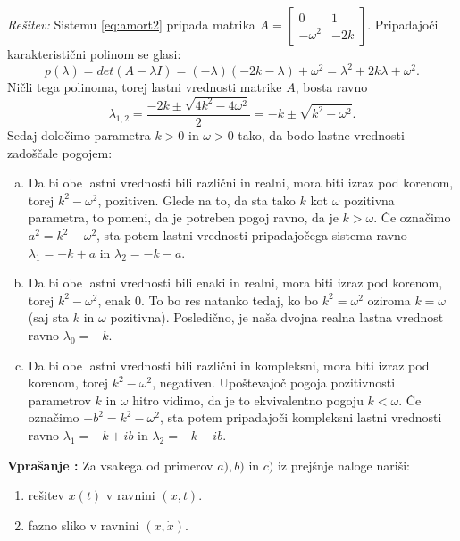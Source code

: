 \documentclass[a4paper, 10pt]{article}
\newcounter{vprcount}
\newenvironment{Vpr}{\begin{flushleft}\stepcounter{vprcount}\textbf{Vprašanje \arabic{vprcount}:}}{\hfill\end{flushleft}}
\newenvironment{Rešitev}{\begin{flushleft}\textit{Rešitev:}}{\hfill\end{flushleft}}
\begin{document}
		\begin{Rešitev}
				Sistemu \ref{eq:amort2} pripada matrika $A = \begin{bmatrix}
				0 & 1 \\
				-\omega^2 & -2k
			\end{bmatrix}$. Pripadajoči karakteristični polinom se glasi: $$p(\lambda) = det(A - \lambda I) = (-\lambda)(-2k-\lambda) + \omega^2 = \lambda^2 + 2k\lambda + \omega^2 .$$ Ničli tega polinoma, torej lastni vrednosti matrike $A$, bosta ravno $$ \lambda_{1, 2} = \frac{-2k \pm \sqrt{4k^2 - 4\omega^2}}{2} = -k \pm \sqrt{k^2 - \omega^2}.$$ Sedaj določimo parametra $k>0$ in $\omega >0$ tako, da bodo lastne vrednosti zadoščale pogojem:
			\begin{enumerate}[a)]
				\item Da bi obe lastni vrednosti bili različni in realni, mora biti izraz pod korenom, torej $k^2 - \omega^2$, pozitiven. Glede na to, da sta tako $k$ kot $\omega$ pozitivna parametra, to pomeni, da je potreben pogoj ravno, da je $k>\omega$. Če označimo $a^2 = k^2 - \omega^2$, sta potem lastni vrednosti pripadajočega sistema ravno $\lambda_1 = -k + a$ in $\lambda_2 = -k-a$.
				\item Da bi obe lastni vrednosti bili enaki in realni, mora biti izraz pod korenom, torej $k^2 - \omega^2$, enak $0$. To bo res natanko tedaj, ko bo $k^2 = \omega^2$ oziroma $k = \omega$ (saj sta $k$ in $\omega$ pozitivna). Posledično, je naša dvojna realna lastna vrednost ravno $\lambda_0 = -k$.
				\item Da bi obe lastni vrednosti bili različni in kompleksni, mora biti izraz pod korenom, torej $k^2 - \omega^2$, negativen. Upoštevajoč pogoja pozitivnosti parametrov $k$ in $\omega$ hitro vidimo, da je to ekvivalentno pogoju $k < \omega$. Če označimo $-b^2=k^2 - \omega^2$, sta potem pripadajoči kompleksni lastni vrednosti ravno $\lambda_1 = -k + ib$ in $\lambda_2=-k-ib$.
			\end{enumerate}
		\end{Rešitev}
		\begin{Vpr}
			Za vsakega od primerov $a), b)$ in $c)$ iz prejšnje naloge nariši: \begin{enumerate}
				\item rešitev $x(t)$ v ravnini $(x, t)$.
				\item fazno sliko v ravnini $(x, \dot{x})$.
			\end{enumerate}
		\end{Vpr}
\end{document}
